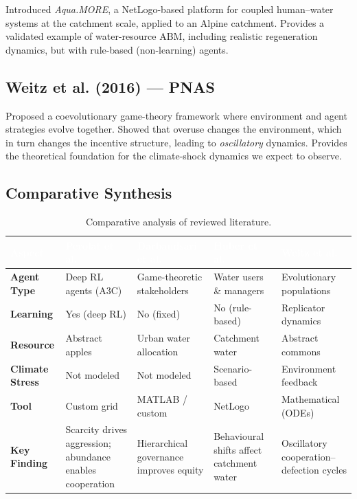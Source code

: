\documentclass[12pt, a4paper]{article}
\begin{document}
Introduced \emph{Aqua.MORE}, a NetLogo-based platform for coupled
human--water systems at the catchment scale, applied to an Alpine catchment.
Provides a validated example of water-resource ABM, including realistic
regeneration dynamics, but with rule-based (non-learning) agents.

\subsection{Weitz et al. (2016) --- PNAS}

Proposed a coevolutionary game-theory framework where environment and agent
strategies evolve together. Showed that overuse changes the environment, which
in turn changes the incentive structure, leading to \emph{oscillatory}
dynamics. Provides the theoretical foundation for the climate-shock dynamics
we expect to observe.

\subsection{Comparative Synthesis}

\begin{table}[H]
    \centering
    \caption{Comparative analysis of reviewed literature.}
    \renewcommand{\arraystretch}{1.25}
    \small
    \begin{tabular}{|p{2.4cm}|p{2.6cm}|p{2.6cm}|p{2.6cm}|p{2.6cm}|}
        \hline
        \rowcolor{nutDark}
        \textcolor{white}{\textbf{Aspect}} &
        \textcolor{white}{\textbf{Perolat et al.}} &
        \textcolor{white}{\textbf{Darbandsari et al.}} &
        \textcolor{white}{\textbf{Huber et al.}} &
        \textcolor{white}{\textbf{Weitz et al.}} \\ \hline
        \textbf{Agent Type} & Deep RL agents (A3C) & Game-theoretic stakeholders & Water users \& managers & Evolutionary populations \\ \hline
        \textbf{Learning} & Yes (deep RL) & No (fixed) & No (rule-based) & Replicator dynamics \\ \hline
        \textbf{Resource} & Abstract apples & Urban water allocation & Catchment water & Abstract commons \\ \hline
        \textbf{Climate Stress} & Not modeled & Not modeled & Scenario-based & Environment feedback \\ \hline
        \textbf{Tool} & Custom grid & MATLAB / custom & NetLogo & Mathematical (ODEs) \\ \hline
        \textbf{Key Finding} & Scarcity drives aggression; abundance enables cooperation & Hierarchical governance improves equity & Behavioural shifts affect catchment water & Oscillatory cooperation--defection cycles \\ \hline
    \end{tabular}
\end{table}
\end{document}
